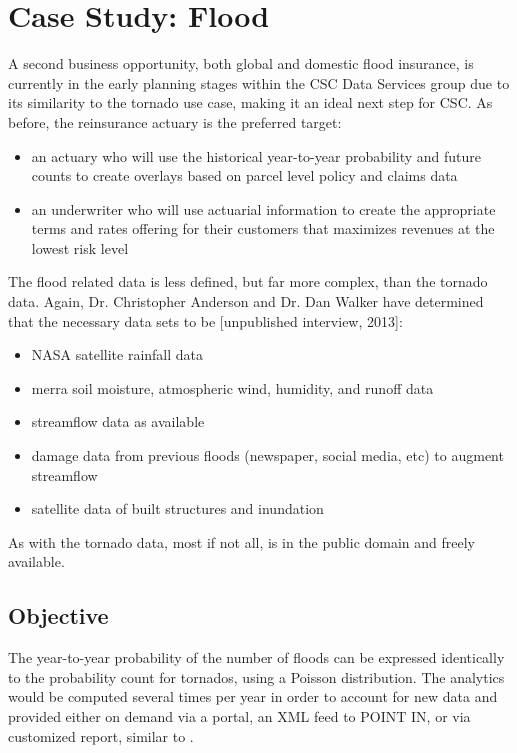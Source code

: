 \section{Case Study: Flood}
A second business opportunity, both global and domestic flood insurance, is currently in the early planning stages within the CSC Data Services group due to its similarity to the tornado use case, making it an ideal next step for CSC.  As before, the reinsurance actuary is the preferred target:
\begin{itemize}
    \item an actuary who will use the historical year-to-year probability and future counts to create overlays based on parcel level policy and claims data
    \item an underwriter who will use actuarial information to create the appropriate terms and rates offering for their customers that maximizes revenues at the lowest risk level
\end{itemize}
The flood related data is less defined, but far more complex, than the tornado data. Again, Dr. Christopher Anderson and Dr. Dan Walker have determined that the necessary data sets to be [unpublished interview, 2013]:
\begin{itemize}
    \item NASA satellite rainfall data
    \item \gls{merra} soil moisture, atmospheric wind,  humidity, and runoff data
    \item streamflow data as available
    \item damage data from previous floods (newspaper, social media, etc) to augment streamflow
    \item satellite data of built structures and inundation
\end{itemize}
As with the tornado data, most if not all, is in the public domain and freely available.
\subsection{Objective}
The year-to-year probability of the number of floods can be expressed identically to the probability count for tornados, using a Poisson distribution. The analytics would be computed several times per year in order to account for new data and provided either on demand via a portal, an XML feed to POINT IN, or via customized  report, similar to \climatedge.
